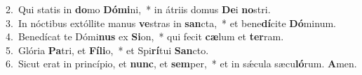 {2.~}Qui statis in \textbf{do}mo \textbf{Dó}\textbf{mi}ni,~* in átriis domus \textbf{De}i \textbf{no}stri.\\
{3.~}In nóctibus extóllite manus \textbf{ve}stras in \textbf{san}cta,~* et bene\textbf{dí}cite \textbf{Dó}minum.\\
{4.~}Benedícat te Dómi\textbf{nus} ex \textbf{Si}on,~* qui fecit \textbf{cæ}lum et \textbf{ter}ram.\\
{5.~}Glória \textbf{Pa}tri, et \textbf{Fí}\textbf{li}o,~* et Spi\textbf{rí}tui \textbf{San}cto.\\
{6.~}Sicut erat in princípio, et \textbf{nunc}, et \textbf{sem}per,~* et in sǽcula sæcu\textbf{ló}rum. \textbf{A}men.\\
